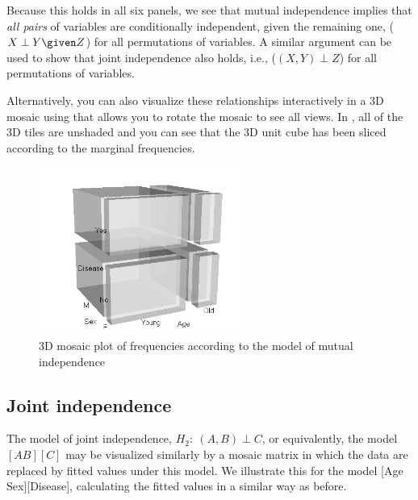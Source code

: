 \documentclass[11pt]{book}
\renewenvironment{knitrout}{\small\renewcommand{\baselinestretch}{.85}}{} %
\begin{document}
Because this holds in all six panels, we see that mutual independence
implies that \emph{all pairs} of variables are conditionally
independent, given the remaining one,  ($X \perp Y \given Z$) for all
permutations of variables.  A similar argument can be used to
show that joint independence also holds, i.e., ($(X,Y) \perp Z$) for all
permutations of variables.

Alternatively, you can also visualize these relationships interactively
in a 3D mosaic using 
that allows you to rotate the mosaic to see all views.  In ,
all of the 3D tiles are unshaded and you can see that the 3D unit cube has been
sliced according to the marginal frequencies.

\begin{knitrout}
\color{fgcolor}\begin{kframe}
\begin{alltt}
\end{alltt}
\end{kframe}
\end{knitrout}

\begin{figure}[!htb]
 \centering
 \includegraphics[width=0.6\textwidth]{ch05/fig/struct-mos3d1.png}
 \caption{3D mosaic plot of frequencies according to the model of mutual independence}\label{fig:struct-mos3d1}
\end{figure}


\subsection{Joint independence}
The model of joint independence, $H_2: \: (A, B) \perp C$, or
equivalently, the \loglin model $[A B][C]$
may be visualized similarly
by a mosaic matrix
in which the data are replaced by fitted values under this model.
We illustrate this for the model [Age Sex][Disease],
calculating the fitted values in a similar way as before.
\end{document}
